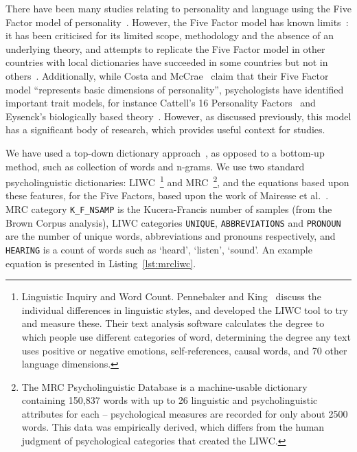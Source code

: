 \documentclass{llncs}
\begin{document}
There have been many studies relating to personality and language
using the Five Factor model of
personality~\cite{pennebaker+king:1999,oberlander+gill:2004,oberlander+gill:2006,iacobelli-et-al:2011}.
However, the Five Factor model has known
limits~\cite{eysenck:1992,paunonen+jackson:2000,block:2010}: it has
been criticised for its limited scope, methodology and the absence of
an underlying theory, and attempts to replicate the Five Factor model
in other countries with local dictionaries have succeeded in some
countries but not in
others~\cite{szirmak+deraad:1994,defruyt-et-al:2004}. Additionally,
while Costa and McCrae~\cite{costa+mccrae:1992} claim that their Five
Factor model ``represents basic dimensions of personality'',
psychologists have identified important trait models, for instance
Cattell's 16 Personality Factors~\cite{cattell:1946} and Eysenck's
biologically based theory~\cite{eysenck:1947}. However, as discussed
previously, this model has a significant body of research, which
provides useful context for studies.

We have used a top-down dictionary
approach~\cite{oberlander+gill:2006}, as opposed to a bottom-up
method, such as collection of words and n-grams. We use two standard
psycholinguistic dictionaries: LIWC~\footnote{Linguistic Inquiry and
Word Count.  Pennebaker and King~\cite{pennebaker+king:1999} discuss
the individual differences in linguistic styles, and developed the
LIWC tool to try and measure these. Their text analysis software
calculates the degree to which people use different categories of
word, determining the degree any text uses positive or negative
emotions, self-references, causal words, and 70 other language
dimensions.} and MRC~\footnote{The MRC Psycholinguistic Database is a
machine-usable dictionary containing 150,837 words with up to 26
linguistic and psycholinguistic attributes for each -- psychological
measures are recorded for only about 2500 words. This data was
empirically derived, which differs from the human judgment of
psychological categories that created the LIWC.}, and the equations
based upon these features, for the Five Factors, based upon the work
of Mairesse et al.~\cite{mairesse-et-al:2007}. MRC category
{\texttt{K\_F\_NSAMP}} is the Kucera-Francis number of samples (from
the Brown Corpus analysis), LIWC categories {\texttt{UNIQUE}},
{\texttt{ABBREVIATIONS}} and {\texttt{PRONOUN}} are the number of unique
words, abbreviations and pronouns respectively, and {\texttt{HEARING}}
is a count of words such as `heard', `listen', `sound'. An example
equation is presented in Listing~\ref{lst:mrcliwc}.
\end{document}
